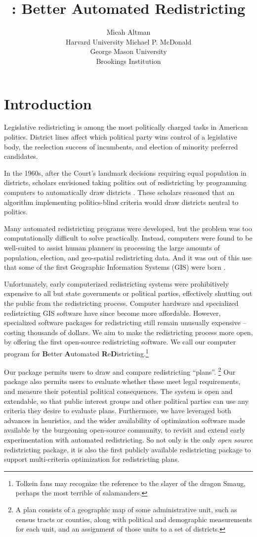\documentclass[article]{JSSstyle/jss}
\author{Micah Altman\\Harvard University
\And Michael P. McDonald \\George Mason University\\Brookings Institution
}
\title{\pkg{BARD}: Better Automated Redistricting}
\begin{document}
\section{Introduction}

Legislative redistricting is among the most politically charged 
tasks in American politics.  District lines affect which political 
party wins control of a legislative body, the reelection success of 
incumbents, and election of minority preferred candidates. 

In the 1960s, after the Court's landmark decisions requiring equal population in districts, scholars envisioned taking politics out of redistricting by 
programming computers to automatically draw districts \citep[][]{Vickrey61, WeaverHess63}.  These scholars reasoned that an algorithm implementing 
politics-blind criteria would draw districts neutral to politics. 

Many automated redistricting programs were  developed, but the problem was too 
computationally difficult to solve practically.  Instead, computers were found to be well-suited to assist human planners in processing the large amounts of population, election, and geo-spatial  redistricting data.  And it was out of this use that some of the first Geographic Information Systems (GIS) 
were born \citep{AltMacMcD05}.  

Unfortunately, early computerized redistricting systems were prohibitively expensive to all but state governments or political parties, effectively shutting out the public from the redistricting process. Computer hardware and specialized redistricting GIS software have since become more affordable. However, specialized software packages for redistricting still remain unusually expensive -- costing thousands of dollars. We aim to make the redistricting process more open, by  offering the first open-source redistricting software. We call our computer program  for \textbf{B}etter \textbf{A}utomated 
\textbf{R}e\textbf{D}istricting.\footnote{Tolkein fans may recognize the 
reference to the slayer of the dragon Smaug, perhaps the most 
terrible of salamanders.}

Our package permits users to draw  
and compare redistricting ``plans''. \footnote{A plan consists of a geographic map of some administrative unit, such as census tracts or counties, along with political and demographic measurements for each unit, and an assignment of those units to a set of districts.} Our package also permits users to evaluate whether these meet legal requirements, and measure their potential political consequences. The system is open and extendable, so that public interest groups and other political parties can use any criteria they desire to evaluate plans. Furthermore, we have leveraged both advances in heuristics, and the wider availability of optimization software made available by the burgeoning open-source community,  to revisit and extend early experimentation with automated redistricting.  So not only is  the only \emph{open source} redistricting package, it is also the first publicly available redistricting package to support multi-criteria optimization for redistricting plans.  
\end{document}

